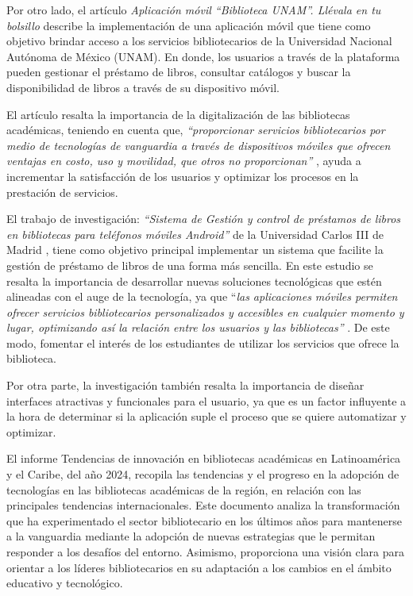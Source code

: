 \documentclass[spanish]{ieee_upb}
\begin{document}
Por otro lado, el artículo \textit{Aplicación móvil “Biblioteca UNAM”. Llévala en tu bolsillo }\cite{martinez2021aplicacion} describe la implementación de una aplicación móvil que tiene como objetivo brindar acceso a los servicios bibliotecarios de la Universidad Nacional Autónoma de México (UNAM). En donde, los usuarios a través de la plataforma pueden gestionar el préstamo de libros, consultar catálogos y buscar la disponibilidad de libros a través de su dispositivo móvil. 
\vspace{0.3 cm}

El artículo resalta la importancia de la digitalización de las bibliotecas académicas, teniendo en cuenta que, \textit{“proporcionar servicios bibliotecarios por medio de tecnologías de vanguardia a través de dispositivos móviles que ofrecen ventajas en costo, uso y movilidad, que otros no proporcionan”} \cite{martinez2021aplicacion}, ayuda a incrementar la satisfacción de los usuarios y optimizar los procesos en la prestación de servicios. 
\vspace{0.3 cm}

El trabajo de investigación: \textit{“Sistema de Gestión y control de préstamos de libros en bibliotecas para teléfonos móviles Android”} de la Universidad Carlos III de Madrid , tiene como objetivo principal implementar un sistema que facilite la gestión de préstamo de libros de una forma más sencilla. En este estudio se resalta la importancia de desarrollar nuevas soluciones tecnológicas que estén alineadas con el auge de la tecnología, ya que “\textit{las aplicaciones móviles permiten ofrecer servicios bibliotecarios personalizados y accesibles en cualquier momento y lugar, optimizando así la relación entre los usuarios y las bibliotecas”} \cite{fombellida2012sistema}. De este modo, fomentar el interés de los estudiantes de utilizar los servicios que ofrece la biblioteca.  
\vspace{0.3 cm}

Por otra parte, la investigación también resalta la importancia de diseñar interfaces atractivas y funcionales para el usuario, ya que es un factor influyente a la hora de determinar si la aplicación suple el proceso que se quiere automatizar y optimizar. 
\vspace{0.3 cm}

El informe Tendencias de innovación en bibliotecas académicas en Latinoamérica y el Caribe, del año 2024, recopila las tendencias y el progreso en la adopción de tecnologías en las bibliotecas académicas de la región, en relación con las principales tendencias internacionales. Este documento analiza la transformación que ha experimentado el sector bibliotecario en los últimos años para mantenerse a la vanguardia mediante la adopción de nuevas estrategias que le permitan responder a los desafíos del entorno. Asimismo, proporciona una visión clara para orientar a los líderes bibliotecarios en su adaptación a los cambios en el ámbito educativo y tecnológico.
\vspace{0.3 cm}
\end{document}

